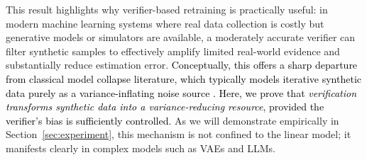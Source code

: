 This result highlights why verifier-based retraining is practically useful: in modern machine learning systems where real data collection is costly but generative models or simulators are available, a moderately accurate verifier can filter synthetic samples to effectively amplify limited real-world evidence and substantially reduce estimation error.
\textcolor{black}{Conceptually, this offers a sharp departure from classical model collapse literature, which typically models iterative synthetic data purely as a variance-inflating noise source \citep{shumailov2024ai,alemohammad2023self,dohmatob2024model}. Here, we prove that \emph{verification transforms synthetic data into a variance-reducing resource}, provided the verifier's bias is sufficiently controlled.}
As we will demonstrate empirically in Section~\ref{sec:experiment}, this mechanism is not confined to the linear model; it manifests clearly in complex models such as VAEs and LLMs.



